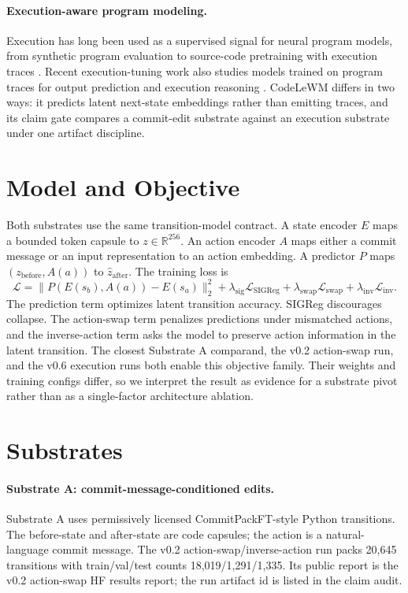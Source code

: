 \documentclass[11pt]{article}
\newcommand{\modelname}{CodeLeWM}
\newcommand{\subA}{Substrate A}
\begin{document}
\paragraph{Execution-aware program modeling.}
Execution has long been used as a supervised signal for neural program models,
from synthetic program evaluation to source-code pretraining with execution
traces \citep{zaremba2015learningexecute,ding2023tracedexecutionawarepretrainingsource}.
Recent execution-tuning work also studies models trained on program traces for
output prediction and execution reasoning
\citep{armengolestape2025iexecuteiunderstand}. \modelname{} differs in two
ways: it predicts latent next-state embeddings rather than emitting traces, and
its claim gate compares a commit-edit substrate against an execution substrate
under one artifact discipline.

\section{Model and Objective}

Both substrates use the same transition-model contract. A state encoder \(E\)
maps a bounded token capsule to \(z \in \mathbb{R}^{256}\). An action encoder \(A\)
maps either a commit message or an input representation to an action embedding.
A predictor \(P\) maps \((z_{\mathrm{before}}, A(a))\) to
\(\hat z_{\mathrm{after}}\). The training loss is
\begin{equation}
  \mathcal{L} =
  \|P(E(s_b), A(a)) - E(s_a)\|_2^2
  + \lambda_{\mathrm{sig}}\mathcal{L}_{\mathrm{SIGReg}}
  + \lambda_{\mathrm{swap}}\mathcal{L}_{\mathrm{swap}}
  + \lambda_{\mathrm{inv}}\mathcal{L}_{\mathrm{inv}}.
\end{equation}
The prediction term optimizes latent transition accuracy. SIGReg discourages
collapse. The action-swap term penalizes predictions under mismatched actions,
and the inverse-action term asks the model to preserve action information in the
latent transition. The closest \subA{} comparand, the v0.2 action-swap run, and
the v0.6 execution runs both enable this objective family. Their weights and
training configs differ, so we interpret the result as evidence for a substrate
pivot rather than as a single-factor architecture ablation.

\section{Substrates}

\paragraph{\subA: commit-message-conditioned edits.}
\subA{} uses permissively licensed CommitPackFT-style Python transitions. The
before-state and after-state are code capsules; the action is a natural-language
commit message. The v0.2 action-swap/inverse-action run packs 20,645
transitions with train/val/test counts 18,019/1,291/1,335. Its public report is
the v0.2 action-swap HF results report; the run artifact id is listed in the
claim audit.
\end{document}
